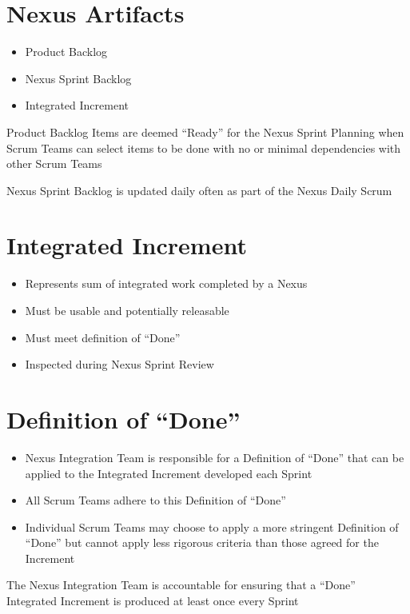 \documentclass[a4paper,11pt,twocolumn]{article}
\begin{document}
\section*{Nexus Artifacts}
\begin{itemize}
	\item Product Backlog
	\item Nexus Sprint Backlog
	\item Integrated Increment
\end{itemize}

\begin{tcolorbox}[colback=black!8!white,colframe=gray!50!black,title=Note,sharp corners,fonttitle=\normalsize\bfseries,fontupper=\normalsize]
	Product Backlog Items are deemed ``Ready'' for the Nexus Sprint Planning when Scrum Teams can select items to be done with no or minimal dependencies with other Scrum Teams
\end{tcolorbox}

\begin{tcolorbox}[colback=black!8!white,colframe=gray!50!black,title=Note,sharp corners,fonttitle=\normalsize\bfseries,fontupper=\normalsize]
	Nexus Sprint Backlog is updated daily often as part of the Nexus Daily Scrum
\end{tcolorbox}

\section*{Integrated Increment}
\begin{itemize}
	\item Represents sum of integrated work completed by a Nexus
	\item Must be usable and potentially releasable
	\item Must meet definition of ``Done''
	\item Inspected during Nexus Sprint Review
\end{itemize}

\section*{Definition of ``Done''}
\begin{itemize}
	\item Nexus Integration Team is responsible for a Definition of ``Done'' that can be applied to the Integrated Increment developed each Sprint
	\item All Scrum Teams adhere to this Definition of ``Done''
	\item Individual Scrum Teams may choose to apply a more stringent Definition of ``Done'' but cannot apply less rigorous criteria than those agreed for the Increment
\end{itemize}

\begin{tcolorbox}[colback=black!8!white,colframe=gray!50!black,title=Note,sharp corners,fonttitle=\normalsize\bfseries,fontupper=\normalsize]
	The Nexus Integration Team is accountable for ensuring that a ``Done'' Integrated Increment is produced at least once every Sprint
\end{tcolorbox}

\nocite{*}


\end{document}

